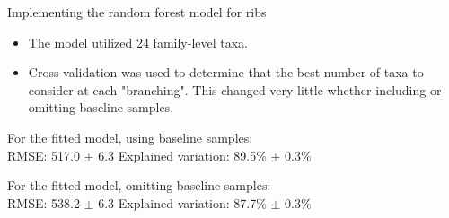 \documentclass{beamer}
\begin{document}
\begin{frame}{Implementing the random forest model for ribs}

\begin{itemize}
\item The model utilized 24 family-level taxa.
\item Cross-validation was used to determine that the best number of
  taxa to consider at each "branching".  This changed very little
  whether including or omitting baseline samples.
\end{itemize}

\vspace{0.1in}

\noindent For the fitted model, using baseline samples:\\
\noindent RMSE: 517.0 $\pm$ 6.3  \hspace{0.05in}  Explained variation: 89.5\%
$\pm$ 0.3\%

\vspace{0.1in}

\noindent For the fitted model, omitting baseline samples:\\
\noindent RMSE: 538.2 $\pm$ 6.3  \hspace{0.05in}  Explained variation: 87.7\%
$\pm$ 0.3\%

\end{frame}
\end{document}
